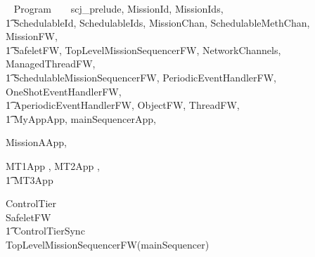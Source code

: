 
%
\begin{zsection}
  \SECTION ~ Program ~ \parents ~ scj\_prelude, MissionId, MissionIds, \\
  \t1 SchedulableId, SchedulableIds, MissionChan, SchedulableMethChan, MissionFW,\\
  \t1 SafeletFW, TopLevelMissionSequencerFW, NetworkChannels, ManagedThreadFW, \\
  \t1 SchedulableMissionSequencerFW, PeriodicEventHandlerFW, OneShotEventHandlerFW,\\
  \t1 AperiodicEventHandlerFW, ObjectFW, ThreadFW, \\
  \t1 MyAppApp, mainSequencerApp,

MissionAApp,

MT1App
	,
MT2App
	,
\\ \t1
MT3App
	
	
	
\end{zsection}
%
\begin{circus}
\circprocess ControlTier \circdef \\
\circblockopen
SafeletFW \\
\t1 \lpar ControlTierSync \rpar \\
TopLevelMissionSequencerFW(mainSequencer)
\circblockclose
\end{circus}
%


